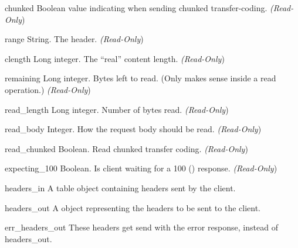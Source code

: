 \begin{memberdesc}[request]{chunked}
  Boolean value indicating when sending chunked transfer-coding.
  \emph{(Read-Only})
\end{memberdesc}

\begin{memberdesc}[request]{range}
  String. The  header.
  \emph{(Read-Only})
\end{memberdesc}

\begin{memberdesc}[request]{clength}
  Long integer. The ``real'' content length.
  \emph{(Read-Only})
\end{memberdesc}

\begin{memberdesc}[request]{remaining}
  Long integer. Bytes left to read. (Only makes sense inside a read
  operation.)
  \emph{(Read-Only})
\end{memberdesc}

\begin{memberdesc}[request]{read_length}
  Long integer. Number of bytes read.
  \emph{(Read-Only})
\end{memberdesc}

\begin{memberdesc}[request]{read_body}
  Integer. How the request body should be read.
  \emph{(Read-Only})
\end{memberdesc}

\begin{memberdesc}[request]{read_chunked}
  Boolean. Read chunked transfer coding.
  \emph{(Read-Only})
\end{memberdesc}

\begin{memberdesc}[request]{expecting_100}
  Boolean. Is client waiting for a 100 () response.
  \emph{(Read-Only})
\end{memberdesc}

\begin{memberdesc}[request]{headers_in}
  A table object containing headers sent by the client.
\end{memberdesc}

\begin{memberdesc}[request]{headers_out}
  A  object representing the headers to be sent to the
  client. 
\end{memberdesc}

\begin{memberdesc}[request]{err_headers_out}
  These headers get send with the error response, instead of
  headers_out.
\end{memberdesc}

